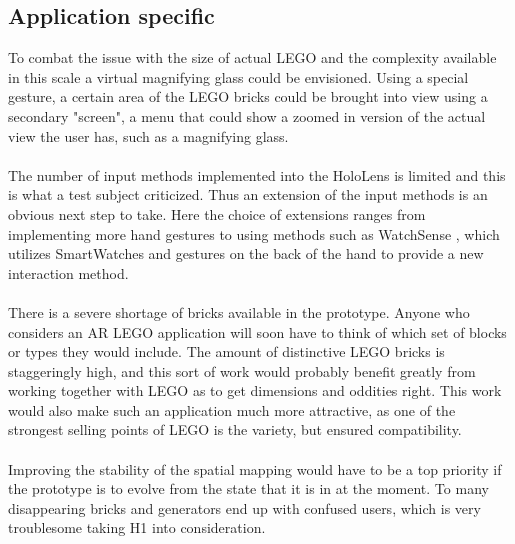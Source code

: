 \subsection{Application specific}
To combat the issue with the size of actual LEGO and the complexity available in this scale a virtual magnifying glass could be envisioned. Using a special gesture, a certain area of the LEGO bricks could be brought into view using a secondary "screen", a menu that could show a zoomed in version of the actual view the user has, such as a magnifying glass.\\
\\
The number of input methods implemented into the HoloLens is limited and this is what a test subject criticized. Thus an extension of the input methods is an obvious next step to take. Here the choice of extensions ranges from implementing more hand gestures to using methods such as WatchSense \cite{watchsense}, which utilizes SmartWatches and gestures on the back of the hand to provide a new interaction method. \\
\\
There is a severe shortage of bricks available in the prototype. Anyone who considers an AR LEGO application will soon have to think of which set of blocks or types they would include. The amount of distinctive LEGO bricks is staggeringly high, and this sort of work would probably benefit greatly from working together with LEGO as to get dimensions and oddities right. This work would also make such an application much more attractive, as one of the strongest selling points of LEGO is the variety, but ensured compatibility.\\
\\
Improving the stability of the spatial mapping would have to be a top priority if the prototype is to evolve from the state that it is in at the moment. To many disappearing bricks and generators end up with confused users, which is very troublesome taking H1 into consideration. 